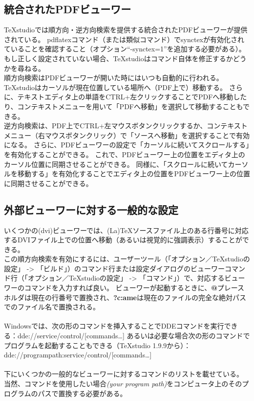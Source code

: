 \documentclass[]{book}
\begin{document}
\subsection{統合されたPDFビューワー}

TeXstudioでは順方向・逆方向検索を提供する統合されたPDFビューワーが提供されている。
pdflatexコマンド（または類似コマンド）でsynctexが有効化されていることを確認すること（オプション``-synctex=1''を追加する必要がある）。
もし正しく設定されていない場合、TeXstudioはコマンド自体を修正するかどうかを尋ねる。\\
順方向検索はPDFビューワーが開いた時にはいつも自動的に行われる。
TeXstudioはカーソルが現在位置している場所へ（PDF上で）移動する。
さらに、テキストエディタ上の単語をCTRL+左クリックすることでPDFへ移動したり、コンテキストメニューを用いて「PDFへ移動」を選択して移動することもできる。\\
逆方向検索は、PDF上でCTRL+左マウスボタンクリックするか、コンテキストメニュー（右マウスボタンクリック）で「ソースへ移動」を選択することで有効になる。
さらに、PDFビューワーの設定で「カーソルに続いてスクロールする」を有効化することができる。
これで、PDFビューワー上の位置をエディタ上のカーソル位置に同期させることができる。
同様に、「スクロールに続いてカーソルを移動する」を有効化することでエディタ上の位置をPDFビューワー上の位置に同期させることができる。

\subsection{外部ビューワーに対する一般的な設定}

いくつかの(dvi)ビューワーでは、(La)TeXソースファイル上のある行番号に対応するDVIファイル上での位置へ移動（あるいは視覚的に強調表示）することができる。\\
この順方向検索を有効にするには、ユーザーツール（「オプション／TeXstudioの設定」
-\textgreater{}
「ビルド」）のコマンド行または設定ダイアログのビューワーコマンド行（「オプション／TeXstudioの設定」
-\textgreater{}
「コマンド」）で、対応するビューワーのコマンドを入力すれば良い。
ビューワーが起動するときに、\textbf{@}プレースホルダは現在の行番号で置換され、\textbf{?c:ame}は現在のファイルの完全な絶対パスでのファイル名で置換される。\\\\
Windowsでは、次の形のコマンドを挿入することでDDEコマンドを実行できる：dde://service/control/{[}commands\ldots{}{]}
あるいは必要な場合次の形のコマンドでプログラムを起動することもできる（TeXstudio
1.9.9から）：dde://programpath:service/control/{[}commands\ldots{}{]}\\\\
下にいくつかの一般的なビューワーに対するコマンドのリストを載せている。
当然、コマンドを使用したい場合\emph{(your program
path)}をコンピュータ上のそのプログラムのパスで置換する必要がある。\\
\end{document}
